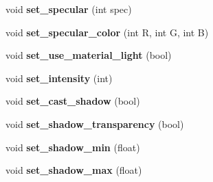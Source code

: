 \begin{DoxyCompactItemize}
void {\bfseries set\+\_\+specular} (int spec)
\item 
\mbox{\label{classmaterial_a19f2f98c71689d85dcf297bb677db1a5}} 
void {\bfseries set\+\_\+specular\+\_\+color} (int R, int G, int B)
\item 
\mbox{\label{classmaterial_ac45022ebbbd5be3b2d4a612217ffec78}} 
void {\bfseries set\+\_\+use\+\_\+material\+\_\+light} (bool)
\item 
\mbox{\label{classmaterial_ac8ec53ce926e139973f8933a1aa81709}} 
void {\bfseries set\+\_\+intensity} (int)
\item 
\mbox{\label{classmaterial_ae29f0fb86dc9855447bbfcaae81d4c6f}} 
void {\bfseries set\+\_\+cast\+\_\+shadow} (bool)
\item 
\mbox{\label{classmaterial_a41c83f8ef4e755606c5e3579d3196c9a}} 
void {\bfseries set\+\_\+shadow\+\_\+transparency} (bool)
\item 
\mbox{\label{classmaterial_a0977543e8d883234536019e5914f8a37}} 
void {\bfseries set\+\_\+shadow\+\_\+min} (float)
\item 
\mbox{\label{classmaterial_a6ccf1dd96ee39e57eebe43363df9268a}} 
void {\bfseries set\+\_\+shadow\+\_\+max} (float)
\end{DoxyCompactItemize}
